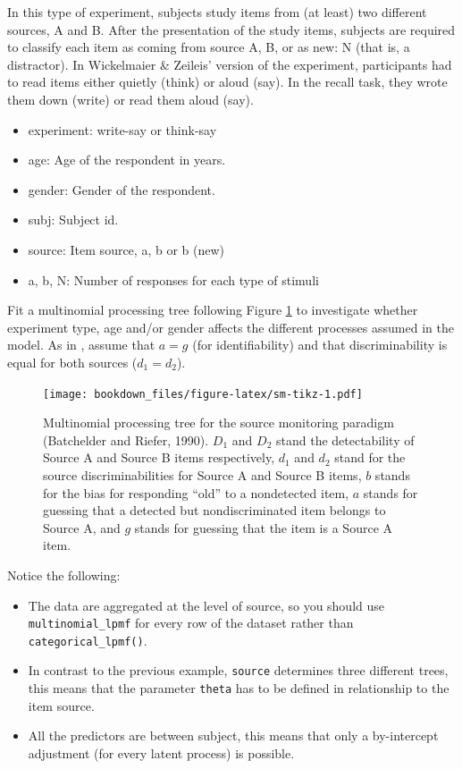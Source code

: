 \documentclass[12pt,]{krantz}
\providecommand{\tightlist}{%
  \setlength{\itemsep}{0pt}\setlength{\parskip}{0pt}}
\theoremstyle{definition}
\theoremstyle{definition}
\theoremstyle{definition}
\theoremstyle{remark}
\begin{document}
In this type of experiment, subjects study items from (at least) two different sources, A and B. After the presentation of the study items, subjects are required to classify each item as coming from source A, B, or as new: N (that is, a distractor). In Wickelmaier \& Zeileis' version of the experiment, participants had to read items either quietly (think) or aloud (say). In the recall task, they wrote them down (write) or read them aloud (say).

\begin{itemize}
\tightlist
\item
  experiment: write-say or think-say
\item
  age: Age of the respondent in years.
\item
  gender: Gender of the respondent.
\item
  subj: Subject id.
\item
  source: Item source, a, b or b (new)
\item
  a, b, N: Number of responses for each type of stimuli
\end{itemize}

Fit a multinomial processing tree following Figure \ref{fig:sm-tikz}
to investigate whether experiment type, age and/or gender affects the different processes assumed in the model.
As in \citet{batchelder1990multinomial}, assume that \(a = g\) (for identifiability) and that discriminability is equal for both sources (\(d_1 = d_2\)).



\begin{figure}
\centering
\texttt{[image: bookdown\_files/figure-latex/sm-tikz-1.pdf]}
\caption{\label{fig:sm-tikz}Multinomial processing tree for the source monitoring paradigm (Batchelder and Riefer, 1990). \(D_1\) and \(D_2\) stand the detectability of Source A and Source B items respectively, \(d_1\) and \(d_2\) stand for the source discriminabilities for Source A and Source B items, \(b\) stands for the bias for responding ``old'' to a nondetected item, \(a\) stands for guessing that a detected but nondiscriminated item belongs to Source A, and \(g\) stands for guessing that the item is a Source A item.}
\end{figure}

Notice the following:

\begin{itemize}
\tightlist
\item
  The data are aggregated at the level of source, so you should use \texttt{multinomial\_lpmf} for every row of the dataset rather than \texttt{categorical\_lpmf()}.
\item
  In contrast to the previous example, \texttt{source} determines three different trees, this means that the parameter \texttt{theta} has to be defined in relationship to the item source.
\item
  All the predictors are between subject, this means that only a by-intercept adjustment (for every latent process) is possible.
\end{itemize}
\end{document}
